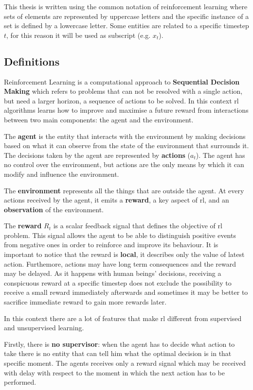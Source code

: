 This thesis is written using the common notation of reinforcement learning where sets of elements are represented by uppercase letters and the specific instance of a set is defined by a lowercase letter. Some entities are related to a specific timestep $t$, for this reason it will be used as subscript (e.g. $x_t$).

\subsection{Definitions}

Reinforcement Learning is a computational approach to \textbf{Sequential Decision Making} which refers to problems that can not be resolved with a single action, but need a larger horizon, a sequence of actions to be solved. In this context \gls{rl} algorithms learns how to improve and maximise a future reward from interactions between two main components: the agent and the environment. 

The \textbf{agent} is the entity that interacts with the environment by making decisions based on what it can observe from the state of the environment that surrounds it. The decisions taken by the agent are represented by \textbf{actions} ($a_t$). The agent has no control over the environment, but actions are the only means by which it can modify and influence the environment.

The \textbf{environment} represents all the things that are outside the agent. At every actions received by the agent, it emits a \textbf{reward}, a key aspect of \gls{rl}, and an \textbf{observation} of the environment.

The \textbf{reward} $R_t$ is a scalar feedback signal that defines the objective of \gls{rl} problem. This signal allows the agent to be able to distinguish positive events from negative ones in order to reinforce and improve its behaviour. It is important to notice that the reward is \textbf{local}, it describes only the value of latest action. Furthemore, actions may have long term consequences and the reward may be delayed. As it happens with human beings' decisions, receiving a conspicuous reward at a specific timestep does not exclude the possibility to receive a small reward immediately afterwards and sometimes it may be better to sacrifice immediate reward to gain more rewards later.


In this context there are a lot of features that make \gls{rl} different from supervised and unsupervised learning.

Firstly, there is \textbf{no supervisor}: when the agent has to decide what action to take there is no entity that can tell him what the optimal decision is in that specific moment. The agents receives only a reward signal which may be received with delay with respect to the moment in which the next action has to be performed.


